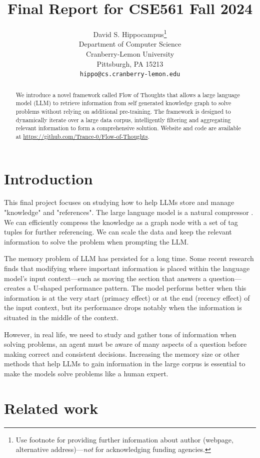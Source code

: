 \documentclass{article}
\title{Final Report for CSE561 Fall 2024}
\author{%
  David S. Hippocampus\thanks{Use footnote for providing further information
    about author (webpage, alternative address)---\emph{not} for acknowledging
    funding agencies.} \\
  Department of Computer Science\\
  Cranberry-Lemon University\\
  Pittsburgh, PA 15213 \\
  \texttt{hippo@cs.cranberry-lemon.edu} \\
}
\begin{document}
\maketitle


\begin{abstract}

We introduce a novel framework called Flow of Thoughts that allows a large language model (LLM) to retrieve information from self generated knowledge graph to solve problems without relying on additional pre-training. The framework is designed to dynamically iterate over a large data corpus, intelligently filtering and aggregating relevant information to form a comprehensive solution. Website and code are available at \url{https://github.com/Trance-0/Flow-of-Thoughts}.

\end{abstract}


\section{Introduction}

This final project focuses on studying how to help LLMs store and manage "knowledge" and "references". The large language model is a natural compressor \cite{delétang2024languagemodelingcompression}. We can efficiently compress the knowledge as a graph node with a set of tag tuples for further referencing. We can scale the data and keep the relevant information to solve the problem when prompting the LLM.

The memory problem of LLM has persisted for a long time. Some recent research finds that modifying where important information is placed within the language model’s input context—such as moving the section that answers a question—creates a U-shaped performance pattern. The model performs better when this information is at the very start (primacy effect) or at the end (recency effect) of the input context, but its performance drops notably when the information is situated in the middle of the context. \cite{liu2023lostmiddlelanguagemodels}

However, in real life, we need to study and gather tons of information when solving problems, an agent must be aware of many aspects of a question before making correct and consistent decisions. Increasing the memory size or other methods that help LLMs to gain information in the large corpus is essential to make the models solve problems like a human expert.

\section{Related work}
\end{document}
